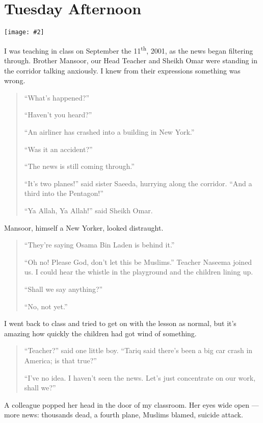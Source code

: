 \documentclass[12pt]{memoir}
\let \Sup=\textsuperscript
\newcommand{\img}[3]{\begin{center}%
\texttt{[image: \#2]}\\{\small\em#3}%
\end{center}}
\begin{document}
\chapter{Tuesday Afternoon}

\img{scale=0.4}{911_Second_Plane.jpg}{}

I was teaching in class on September the 11\Sup{th}, 2001,
as the news began filtering through.
Brother Mansoor, our Head Teacher and Sheikh Omar
were standing in the corridor talking anxiously.
I knew from their expressions something was wrong.

\begin{quote}
“What’s happened?”

“Haven’t you heard?”

“An airliner has crashed into a building in New York.”

“Was it an accident?”

“The news is still coming through.”

“It’s two planes!” said sister Saeeda, hurrying along the corridor.
“And a third into the Pentagon!”

“Ya Allah, Ya Allah!” said Sheikh Omar.
\end{quote}

Mansoor, himself a New Yorker, looked distraught.

\begin{quote}
“They’re saying Osama Bin Laden is behind it.”

“Oh no! Please God, don’t let this be Muslims.” Teacher Naseema joined us.
I could hear the whistle in the playground and the children lining up.

“Shall we say anything?”

“No, not yet.”
\end{quote}

I went back to class and tried to get on with the lesson as normal,
but it’s amazing how quickly the children had got wind of something.

\begin{quote}
“Teacher?” said one little boy.
“Tariq said there’s been a big car crash in America; is that true?”

“I’ve no idea.
I haven’t seen the news.
Let’s just concentrate on our work, shall we?”
\end{quote}

A colleague popped her head in the door of my classroom.
Her eyes wide open — more news:
thousands dead, a fourth plane, Muslims blamed, suicide attack.
\end{document}
